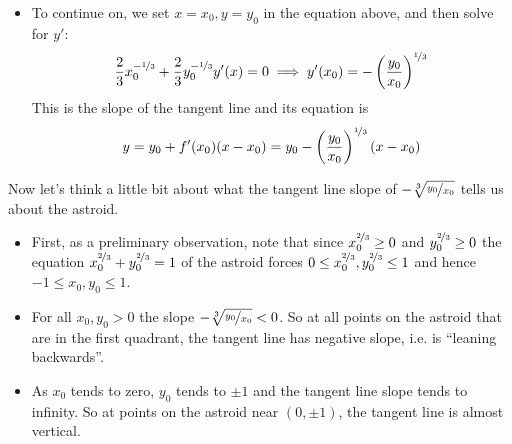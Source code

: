 \begin{eg}
\begin{itemize}
\item To continue on, we set $x=x_0, y=y_0$ in the equation above, and
then solve for $y'$:
\begin{equation*}
\frac{2}{3}x_0^{-\nicefrac{1}{3}}
+\frac{2}{3} y_0^{-\nicefrac{1}{3}} y'(x)=0
\implies y'(x_0)= -\left( \frac{y_0}{x_0} \right)^{\nicefrac{1}{3}}
\end{equation*}
This is the slope of the tangent line and its equation is
\begin{equation*}
y=y_0+f'(x_0)(x-x_0) = y_0
-\left(\frac{y_0}{x_0}\right)^{\nicefrac{1}{3}}(x-x_0)
\end{equation*}
\end{itemize}


Now let's think a little bit about what the tangent line slope of
$-\root{3}\of {\nicefrac{y_0}{x_0}}$ tells us about the astroid.
\begin{itemize}
 \item First, as a preliminary observation, note that since
$x_0^{\nicefrac{2}{3}}\ge0$ and $y_0^{\nicefrac{2}{3}}\ge0$ the equation
$x_0^{\nicefrac{2}{3}}+y_0^{\nicefrac{2}{3}}=1$ of the astroid forces
$0\le x_0^{\nicefrac{2}{3}},y_0^{\nicefrac{2}{3}} \le 1$ and
hence $-1\le x_0,y_0\le 1$.

\item For all $x_0,y_0>0$ the slope $-\root{3}\of {\nicefrac{y_0}{x_0}}
<0$. So at all points on the astroid that are in the first quadrant,
the tangent line has negative slope, i.e. is ``leaning backwards''.

\item  As $x_0$ tends to zero, $y_0$ tends to $\pm 1$ and the
tangent line slope tends to infinity. So at points on the astroid near
$(0,\pm 1)$, the tangent line is almost vertical.


\end{itemize}
\end{eg}
